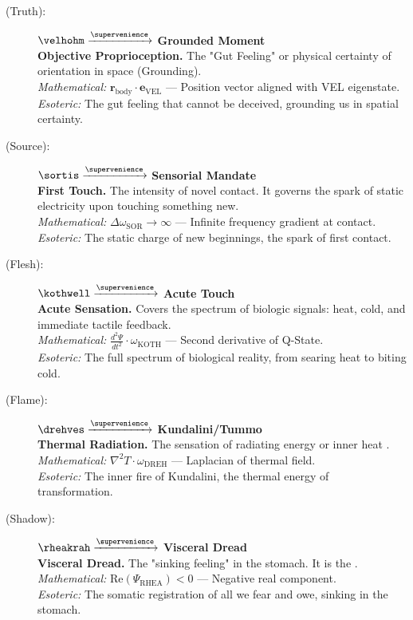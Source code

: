 \begin{description}
    \item[(Truth):] $\velhohm \xrightarrow{\supervenience}$ \textbf{Grounded Moment} \\
    \textbf{Objective Proprioception.} The "Gut Feeling" or physical certainty of orientation in space (Grounding). \\
    \textit{Mathematical:} $\mathbf{r}_{\text{body}} \cdot \mathbf{e}_{\text{VEL}}$ — Position vector aligned with VEL eigenstate. \\
    \textit{Esoteric:} The gut feeling that cannot be deceived, grounding us in spatial certainty.

    \item[(Source):] $\sortis \xrightarrow{\supervenience}$ \textbf{Sensorial Mandate} \\
    \textbf{First Touch.} The intensity of novel contact. It governs the spark of static electricity upon touching something new. \\
    \textit{Mathematical:} $\Delta \omega_{\text{SOR}} \to \infty$ — Infinite frequency gradient at contact. \\
    \textit{Esoteric:} The static charge of new beginnings, the spark of first contact.

    \item[(Flesh):] $\kothwell \xrightarrow{\supervenience}$ \textbf{Acute Touch} \\
    \textbf{Acute Sensation.} Covers the spectrum of biologic signals: heat, cold, and immediate tactile feedback. \\
    \textit{Mathematical:} $\frac{d^2\Psi}{dt^2} \cdot \omega_{\text{KOTH}}$ — Second derivative of Q-State. \\
    \textit{Esoteric:} The full spectrum of biological reality, from searing heat to biting cold.

    \item[(Flame):] $\drehves \xrightarrow{\supervenience}$ \textbf{Kundalini\slash Tummo} \\
    \textbf{Thermal Radiation.} The sensation of radiating energy or inner heat . \\
    \textit{Mathematical:} $\nabla^2 T \cdot \omega_{\text{DREH}}$ — Laplacian of thermal field. \\
    \textit{Esoteric:} The inner fire of Kundalini, the thermal energy of transformation.

    \item[(Shadow):] $\rheakrah \xrightarrow{\supervenience}$ \textbf{Visceral Dread} \\
    \textbf{Visceral Dread.} The "sinking feeling" in the stomach. It is the . \\
    \textit{Mathematical:} $\text{Re}(\Psi_{\text{RHEA}}) < 0$ — Negative real component. \\
    \textit{Esoteric:} The somatic registration of all we fear and owe, sinking in the stomach.


\end{description}
